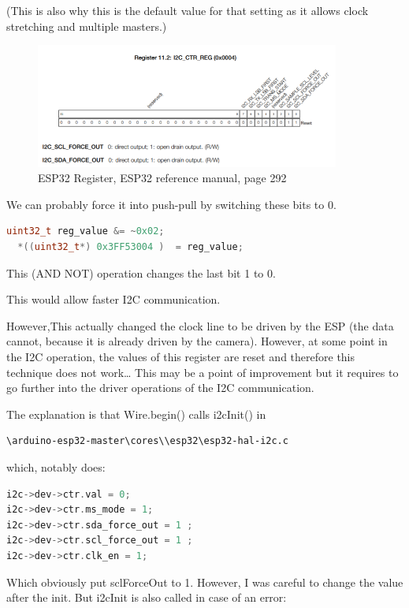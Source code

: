 \documentclass[a4paper]{article}
\begin{document}
(This is also why this is the default value for that setting as it allows clock stretching and multiple masters.)

\begin{figure}
    \centering
    \includegraphics[width = 10cm]{images/reg_esp.png}
    \caption{ESP32 Register, ESP32 reference manual, page 292}
    \label{fig:reg_esp}
\end{figure}

We can probably force it into push-pull by switching these bits to 0.
\begin{lstlisting}[language=C++]
  uint32_t reg_value &= ~0x02;
  *((uint32_t*) 0x3FF53004 )  = reg_value;
\end{lstlisting}

This (AND NOT) operation changes the last bit 1 to 0.

This would allow faster I2C communication.

However,This actually changed the clock line to be driven by the ESP (the data cannot, because it is already driven by the camera). However, at some point in the I2C operation, the values of this register are reset and therefore this technique does not work… This may be a point of improvement but it requires to go further into the driver operations of the I2C communication. 

The explanation is that Wire.begin() calls i2cInit() in
\begin{lstlisting}
\arduino-esp32-master\cores\\esp32\esp32-hal-i2c.c
\end{lstlisting}which, notably does:

\begin{lstlisting}[language=C++]
i2c->dev->ctr.val = 0;
i2c->dev->ctr.ms_mode = 1;
i2c->dev->ctr.sda_force_out = 1 ;
i2c->dev->ctr.scl_force_out = 1 ;
i2c->dev->ctr.clk_en = 1;
\end{lstlisting}

Which obviously put sclForceOut to 1. However, I was careful to change the value after the init. But i2cInit is also called in case of an error:
\end{document}
